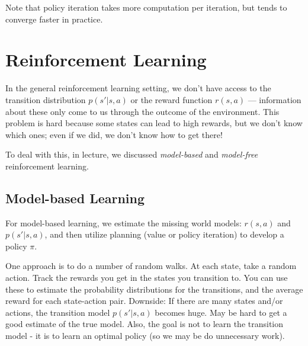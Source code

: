 \documentclass[12pt]{article}
\begin{document}
Note that policy iteration takes more computation per iteration, but tends to converge faster in practice.


\section{Reinforcement Learning}

In the general reinforcement learning setting, we don't have access to the transition distribution $p(s'|s,a)$ or the reward function $r(s,a)$ --- information about these only come to us through the outcome of the environment. 
This problem is hard because some states can lead to high rewards, but we don't know which ones; even if we did, we don't know how to get there!

To deal with this, in lecture, we discussed \textit{model-based} and \textit{model-free} reinforcement learning. 


\subsection{Model-based Learning}

For model-based learning, we estimate the missing world models: $r(s, a)$ and $p(s'|s, a)$, and then utilize planning (value or policy iteration) to develop a policy $\pi$.


\vspace{1pc}


\vspace{.5pc}

\noindent {}

\vspace{.5pc}

\begin{solution}
 One approach is to do a number of random walks. At each state, take a random action. Track the rewards you get in the states you transition to. You can use these to estimate the probability distributions for the transitions, and the average reward for each state-action pair. Downside: If there are many states and/or actions, the transition model $p(s'|s,a)$ becomes huge. May be hard to get a good estimate of the true model. Also, the goal is not to learn the transition model - it is to learn an optimal policy (so we may be do unnecessary work).
\end{solution}
\end{document}
